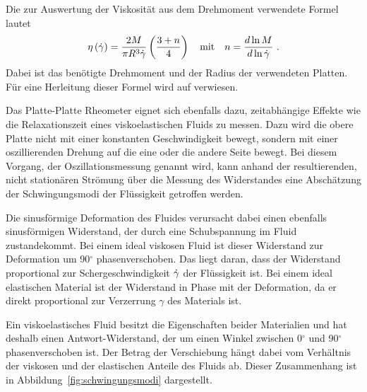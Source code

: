 Die zur Auswertung der Viskosität aus dem Drehmoment verwendete Formel lautet
\begin{equation}
    \label{eq:platterheovisko}
    \eta\left( \dot\gamma \right) = \frac{2M}{\pi R^3 \dot\gamma}\left( \frac{3+n}{4} \right)\quad\text{mit}\quad n=\frac{d\ln M}{d\ln\dot\gamma}~.
\end{equation}
Dabei ist  das benötigte Drehmoment und  der Radius der verwendeten Platten.
Für eine Herleitung dieser Formel wird auf \cite{introtorheo} verwiesen.

Das Platte-Platte Rheometer eignet sich ebenfalls dazu, zeitabhängige Effekte wie die Relaxationszeit eines viskoelastischen Fluids zu messen.
Dazu wird die obere Platte nicht mit einer konstanten Geschwindigkeit bewegt, sondern mit einer oszillierenden Drehung auf die eine oder die andere Seite bewegt.
Bei diesem Vorgang, der Oszillationsmessung genannt wird, kann anhand der resultierenden, nicht stationären Strömung über die Messung des Widerstandes eine Abschätzung der Schwingungsmodi der Flüssigkeit getroffen werden.

Die sinusförmige Deformation  des Fluides verursacht dabei einen ebenfalls sinusförmigen Widerstand, der durch eine Schubspannung  im Fluid zustandekommt.
Bei einem ideal viskosen Fluid ist dieser Widerstand zur Deformation um 90$^\circ$ phasenverschoben. Das liegt daran, dass der Widerstand proportional zur Schergeschwindigkeit $\dot\gamma$ der Flüssigkeit ist.
Bei einem ideal elastischen Material ist der Widerstand in Phase mit der Deformation, da er direkt proportional zur Verzerrung $\gamma$ des Materials ist.

Ein viskoelastisches Fluid besitzt die Eigenschaften beider Materialien und hat deshalb einen Antwort-Widerstand, der um einen Winkel zwischen 0$^\circ$ und 90$^\circ$ phasenverschoben ist. Der Betrag der Verschiebung hängt dabei vom Verhältnis der viskosen und der elastischen Anteile des Fluids ab. Dieser Zusammenhang ist in Abbildung~\ref{fig:schwingungsmodi} dargestellt.

